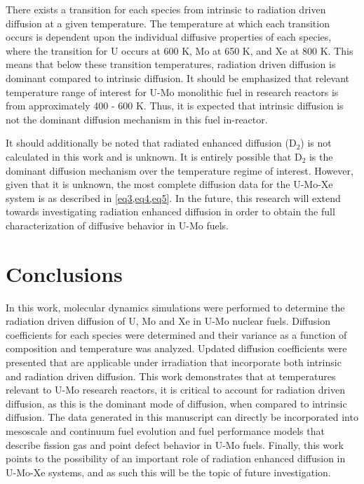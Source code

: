 \documentclass[review]{elsarticle}
\begin{document}
There exists a transition for each species from intrinsic to radiation driven diffusion at a given temperature. The temperature at which each transition occurs is dependent upon the individual diffusive properties of each species, where the transition for U occurs at 600 K, Mo at 650 K, and Xe at 800 K. This means that below these transition temperatures, radiation driven diffusion is dominant compared to intrinsic diffusion. It should be emphasized that relevant temperature range of interest for U-Mo monolithic fuel in research reactors is from approximately 400 - 600 K. Thus, it is expected that intrinsic diffusion is not the dominant diffusion mechanism in this fuel in-reactor.

It should additionally be noted that radiated enhanced diffusion (D$_2$) is not calculated in this work and is unknown. It is entirely possible that D$_2$ is the dominant diffusion mechanism over the temperature regime of interest. However, given that it is unknown, the most complete diffusion data for the U-Mo-Xe system is as described in \cref{eq3,eq4,eq5}. In the future, this research will extend towards investigating radiation enhanced diffusion in order to obtain the full characterization of diffusive behavior in U-Mo fuels. 

\FloatBarrier

\section{Conclusions}

In this work, molecular dynamics simulations were performed to determine the radiation driven diffusion of U, Mo and Xe in U-Mo nuclear fuels. Diffusion coefficients for each species were determined and their variance as a function of composition and temperature was analyzed. Updated diffusion coefficients were presented that are applicable under irradiation that incorporate both intrinsic and radiation driven diffusion. This work demonstrates that at temperatures relevant to U-Mo research reactors, it is critical to account for radiation driven diffusion, as this is the dominant mode of diffusion, when compared to intrinsic diffusion. The data generated in this manuscript can directly be incorporated into mesoscale and continuum fuel evolution and fuel performance models that describe fission gas and point defect behavior in U-Mo fuels. Finally, this work points to the possibility of an important role of radiation enhanced diffusion in U-Mo-Xe systems, and as such this will be the topic of future investigation. 
\end{document}
